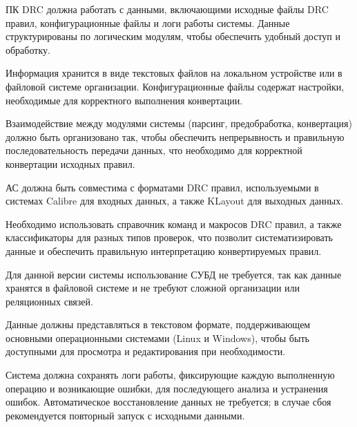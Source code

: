 

ПК DRC должна работать с данными, включающими исходные файлы DRC правил,
конфигурационные файлы и логи работы системы.
Данные структурированы по логическим модулям,
чтобы обеспечить удобный доступ и обработку.


Информация хранится в виде текстовых файлов на локальном устройстве
или в файловой системе организации.
Конфигурационные файлы содержат настройки,
необходимые для корректного выполнения конвертации.


Взаимодействие между модулями системы (парсинг, предобработка, конвертация)
должно быть организовано так, чтобы обеспечить непрерывность
и правильную последовательность передачи данных,
что необходимо для корректной конвертации исходных правил.


АС должна быть совместима с форматами DRC правил,
используемыми в системах Calibre для входных данных,
а также KLayout для выходных данных.


Необходимо использовать справочник команд и макросов DRC правил,
а также классификаторы для разных типов проверок,
что позволит систематизировать данные
и обеспечить правильную интерпретацию конвертируемых правил.


Для данной версии системы использование СУБД не требуется,
так как данные хранятся в файловой системе
и не требуют сложной организации или реляционных связей.


Данные должны представляться в текстовом формате,
поддерживающем основными операционными системами (Linux и Windows),
чтобы быть доступными для просмотра и редактирования при необходимости.


Система должна сохранять логи работы, фиксирующие каждую выполненную операцию
и возникающие ошибки, для последующего анализа и устранения ошибок.
Автоматическое восстановление данных не требуется;
в случае сбоя рекомендуется повторный запуск с исходными данными.

